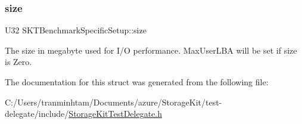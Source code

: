 \subsubsection{\texorpdfstring{size}{size}}
{\footnotesize\ttfamily U32 S\+K\+T\+Benchmark\+Specific\+Setup\+::size}

The size in megabyte used for I/O performance. Max\+User\+L\+BA will be set if size is Zero. 

The documentation for this struct was generated from the following file\+:\begin{DoxyCompactItemize}
\item 
C\+:/\+Users/tranminhtam/\+Documents/azure/\+Storage\+Kit/test-\/delegate/include/\mbox{\hyperlink{_storage_kit_test_delegate_8h}{Storage\+Kit\+Test\+Delegate.\+h}}\end{DoxyCompactItemize}
